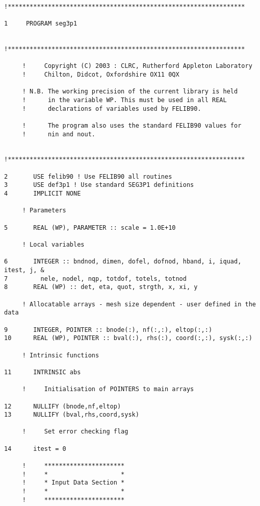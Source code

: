  \begin{verbatim}
     !*****************************************************************
     
1     PROGRAM seg3p1
     
     !*****************************************************************
     
     !     Copyright (C) 2003 : CLRC, Rutherford Appleton Laboratory
     !     Chilton, Didcot, Oxfordshire OX11 0QX
     
     ! N.B. The working precision of the current library is held
     !      in the variable WP. This must be used in all REAL
     !      declarations of variables used by FELIB90.
     
     !      The program also uses the standard FELIB90 values for 
     !      nin and nout.
     
     !*****************************************************************
     
2       USE felib90 ! Use FELIB90 all routines
3       USE def3p1 ! Use standard SEG3P1 definitions
4       IMPLICIT NONE
     
     ! Parameters
     
5       REAL (WP), PARAMETER :: scale = 1.0E+10
     
     ! Local variables
     
6       INTEGER :: bndnod, dimen, dofel, dofnod, hband, i, iquad, itest, j, &
7         nele, nodel, nqp, totdof, totels, totnod
8       REAL (WP) :: det, eta, quot, strgth, x, xi, y
     
     ! Allocatable arrays - mesh size dependent - user defined in the data
     
9       INTEGER, POINTER :: bnode(:), nf(:,:), eltop(:,:)
10      REAL (WP), POINTER :: bval(:), rhs(:), coord(:,:), sysk(:,:)
     
     ! Intrinsic functions
     
11      INTRINSIC abs
     
     !     Initialisation of POINTERS to main arrays
     
12      NULLIFY (bnode,nf,eltop)
13      NULLIFY (bval,rhs,coord,sysk)
     
     !     Set error checking flag
     
14      itest = 0
     
     !     **********************
     !     *                    *
     !     * Input Data Section *
     !     *                    *
     !     **********************
     

\end{verbatim}
